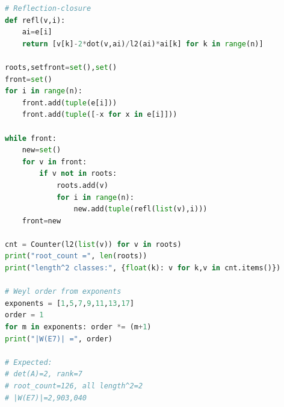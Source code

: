 \documentclass[12pt]{article}
\begin{document}
\begin{lstlisting}[language=Python,basicstyle=\ttfamily\small]
# Reflection-closure
def refl(v,i):
    ai=e[i]
    return [v[k]-2*dot(v,ai)/l2(ai)*ai[k] for k in range(n)]

roots,setfront=set(),set()
front=set()
for i in range(n):
    front.add(tuple(e[i]))
    front.add(tuple([-x for x in e[i]]))

while front:
    new=set()
    for v in front:
        if v not in roots:
            roots.add(v)
            for i in range(n):
                new.add(tuple(refl(list(v),i)))
    front=new

cnt = Counter(l2(list(v)) for v in roots)
print("root_count =", len(roots))
print("length^2 classes:", {float(k): v for k,v in cnt.items()})

# Weyl order from exponents
exponents = [1,5,7,9,11,13,17]
order = 1
for m in exponents: order *= (m+1)
print("|W(E7)| =", order)

# Expected:
# det(A)=2, rank=7
# root_count=126, all length^2=2
# |W(E7)|=2,903,040
\end{lstlisting}

\nocite{*}


\end{document}
